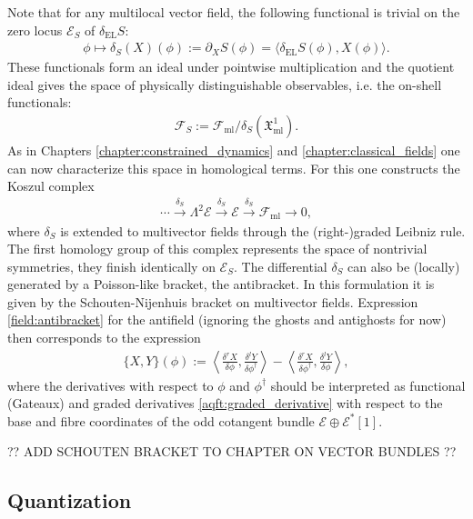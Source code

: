     Note that for any multilocal vector field, the following functional is trivial on the zero locus $\mathcal{E}_S$ of $\delta_\mathrm{EL}S$:
    \begin{gather}
        \phi\mapsto\delta_S(X)(\phi):=\partial_XS(\phi)=\langle\delta_\mathrm{EL}S(\phi),X(\phi)\rangle.
    \end{gather}
    These functionals form an ideal under pointwise multiplication and the quotient ideal gives the space of physically distinguishable observables, i.e. the on-shell functionals:
    \begin{gather}
        \mathcal{F}_S := \mathcal{F}_\mathrm{ml}/\delta_S(\mathfrak{X}^1_\mathrm{ml}).
    \end{gather}
    As in Chapters \ref{chapter:constrained_dynamics} and \ref{chapter:classical_fields} one can now characterize this space in homological terms. For this one constructs the Koszul complex
    \begin{gather}
        \cdots\overset{\delta_S}{\longrightarrow}\Lambda^2\mathcal{E}\overset{\delta_S}{\longrightarrow}\mathcal{E}\overset{\delta_S}{\longrightarrow}\mathcal{F}_\mathrm{ml}\longrightarrow0,
    \end{gather}
    where $\delta_S$ is extended to multivector fields through the (right-)graded Leibniz rule. The first homology group of this complex represents the space of nontrivial symmetries, they finish identically on $\mathcal{E}_S$. The differential $\delta_S$ can also be (locally) generated by a Poisson-like bracket, the antibracket. In this formulation it is given by the Schouten-Nijenhuis bracket on multivector fields. Expression \ref{field:antibracket} for the antifield (ignoring the ghosts and antighosts for now) then corresponds to the expression
    \begin{gather}
        \{X,Y\}(\phi) := \left\langle\frac{\delta^rX}{\delta\phi},\frac{\delta^lY}{\delta\phi^\dagger}\right\rangle - \left\langle\frac{\delta^rX}{\delta\phi^\dagger},\frac{\delta^lY}{\delta\phi}\right\rangle,
    \end{gather}
    where the derivatives with respect to $\phi$ and $\phi^\dagger$ should be interpreted as functional (Gateaux) and graded derivatives \ref{aqft:graded_derivative} with respect to the base and fibre coordinates of the odd cotangent bundle $\mathcal{E}\oplus\mathcal{E}^*[1]$.

    ?? ADD SCHOUTEN BRACKET TO CHAPTER ON VECTOR BUNDLES ??

\subsection{Quantization}

